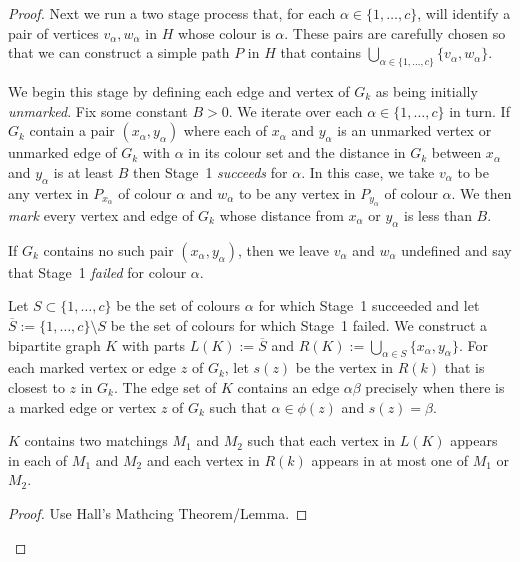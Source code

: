 \documentclass{patmorin}
\begin{document}
\begin{proof}
  Next we run a two stage process that, for each $\alpha\in\{1,\ldots,c\}$, will identify a pair of vertices $v_\alpha,w_\alpha$ in $H$ whose colour is $\alpha$.  These pairs are carefully chosen so that we can construct a simple path $P$ in $H$ that contains $\bigcup_{\alpha\in\{1,\ldots,c\}} \{v_\alpha,w_\alpha\}$.  
  
  \begin{compactenum}[Stage 1]
    \item We begin this stage by defining each edge and vertex of $G_k$ as being initially \emph{unmarked}.  Fix some constant $B>0$.  We iterate over each $\alpha\in\{1,\ldots,c\}$ in turn.  If $G_k$ contain a pair $(x_\alpha,y_\alpha)$ where each of $x_\alpha$ and $y_\alpha$ is an unmarked vertex or unmarked edge of $G_k$ with $\alpha$ in its colour set and the distance in $G_k$ between $x_\alpha$ and $y_\alpha$ is at least $B$ then Stage~1 \emph{succeeds} for $\alpha$.  In this case, we take $v_\alpha$ to be any vertex in $P_{x_\alpha}$ of colour $\alpha$ and $w_\alpha$ to be any vertex in $P_{y_\alpha}$ of colour $\alpha$.  We then \emph{mark} every vertex and edge of $G_k$ whose distance from $x_\alpha$ or $y_\alpha$ is less than $B$.
    
    If $G_k$ contains no such pair $(x_\alpha,y_\alpha)$, then we leave $v_\alpha$ and $w_\alpha$ undefined and say that Stage~1 \emph{failed} for colour $\alpha$.

    \item Let $S\subset\{1,\ldots,c\}$ be the set of colours $\alpha$ for which Stage~1 succeeded and let $\overline{S}:=\{1,\ldots,c\}\setminus S$ be the set of colours for which Stage~1 failed.  We construct a bipartite graph $K$ with parts $L(K):=\overline{S}$ and $R(K):=\bigcup_{\alpha\in S}\{x_\alpha,y_\alpha\}$.   For each marked vertex or edge $z$ of $G_k$, let $s(z)$ be the vertex in $R(k)$ that is closest to $z$ in $G_k$.  The edge set of $K$ contains an edge $\alpha\beta$ precisely when there is a marked edge or vertex $z$ of $G_k$ such that $\alpha\in\phi(z)$ and $s(z)=\beta$.
    
    
    \begin{clm}
      $K$ contains two matchings $M_1$ and $M_2$ such that each vertex in $L(K)$ appears in each of $M_1$ and $M_2$ and each vertex in $R(k)$ appears in at most one of $M_1$ or $M_2$.
    \end{clm}
    
    \begin{proof}
      Use Hall's Mathcing Theorem/Lemma.
    \end{proof}
    

\end{compactenum}
\end{proof}
\end{document}
